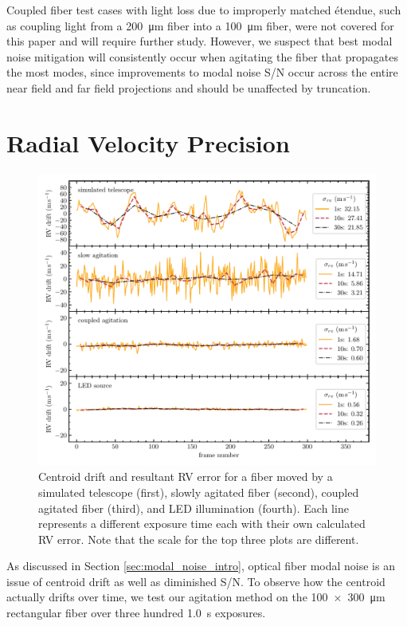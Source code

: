 \documentclass[twocolumn]{emulateapj}
\begin{document}
Coupled fiber test cases with light loss due to improperly matched \'etendue, such as coupling light from a \SI{200}{\micro\meter} fiber into a \SI{100}{\micro\meter} fiber, were not covered for this paper and will require further study. However, we suspect that best modal noise mitigation will consistently occur when agitating the fiber that propagates the most modes, since improvements to modal noise S/N occur across the entire near field and far field projections and should be unaffected by truncation.

\section{Radial Velocity Precision}
\label{sec:rv_precision}

\begin{figure}
\centering
	\includegraphics[width=\textwidth]{images/rv_error.pdf}
	\caption{Centroid drift and resultant RV error for a fiber moved by a simulated telescope (first), slowly agitated fiber (second), coupled agitated fiber (third), and LED illumination (fourth). Each line represents a different exposure time each with their own calculated RV error. Note that the scale for the top three plots are different.}
\label{fig:rv_error}
\end{figure}

As discussed in Section \ref{sec:modal_noise_intro}, optical fiber modal noise is an issue of centroid drift as well as diminished S/N. To observe how the centroid actually drifts over time, we test our agitation method on the \SI{100x300}{\micro\meter} rectangular fiber over three hundred \SI{1.0}{\second} exposures.
\end{document}
